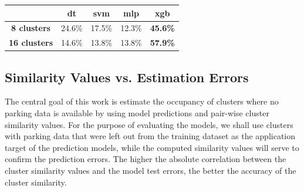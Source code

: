 	\begin{table}[!ht]
		{\begin{tabular}{ | c | c | c | c | c |}
				\hline
				& \textbf{dt} & \textbf{svm} & \textbf{mlp} & \textbf{xgb} \\ \hline
				\textbf{8 clusters} & 24.6\% & 17.5\% & 12.3\% & \textbf{45.6\%} \\ \hline
				\textbf{16 clusters} & 14.6\% & 13.8\% & 13.8\% & \textbf{57.9\%} \\ \hline
			\end{tabular}}
			\label{evaluation:best_model_method}
	\end{table}
		
	\subsection{Similarity Values vs. Estimation Errors}
	The central goal of this work is estimate the occupancy of clusters where no parking data is available by using model predictions and pair-wise cluster similarity values. For the purpose of evaluating the models, we shall use clusters with parking data that were left out from the training dataset as the application target of the prediction models, while the computed similarity values will serve to confirm the prediction errors. The higher the absolute correlation between the cluster similarity values and the model test errors, the better the accuracy of the cluster similarity. 
	
	
	 
